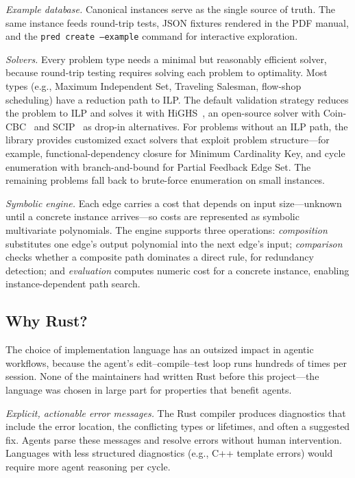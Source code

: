 \documentclass[conference]{IEEEtran}
\begin{document}
\emph{Example database.}
Canonical instances serve as the single source of truth.
The same instance feeds round-trip tests, JSON fixtures rendered in the PDF manual, and the \texttt{pred create --example} command for interactive exploration.

\emph{Solvers.}
Every problem type needs a minimal but reasonably efficient solver, because round-trip testing requires solving each problem to optimality.
Most types (e.g., Maximum Independent Set, Traveling Salesman, flow-shop scheduling) have a reduction path to ILP.
The default validation strategy reduces the problem to ILP and solves it with HiGHS~\cite{Huangfu2018HiGHS}, an open-source solver with Coin-CBC~\cite{Forrest2023CoinCBC} and SCIP~\cite{Achterberg2009SCIP} as drop-in alternatives.
For problems without an ILP path, the library provides customized exact solvers that exploit problem structure---for example, functional-dependency closure for Minimum Cardinality Key, and cycle enumeration with branch-and-bound for Partial Feedback Edge Set.
The remaining problems fall back to brute-force enumeration on small instances.

\emph{Symbolic engine.}
Each edge carries a cost that depends on input size---unknown until a concrete instance arrives---so costs are represented as symbolic multivariate polynomials.
The engine supports three operations: \emph{composition} substitutes one edge's output polynomial into the next edge's input; \emph{comparison} checks whether a composite path dominates a direct rule, for redundancy detection; and \emph{evaluation} computes numeric cost for a concrete instance, enabling instance-dependent path search.

\subsection{Why Rust?}\label{sec:why-rust}

The choice of implementation language has an outsized impact in agentic workflows, because the agent's edit--compile--test loop runs hundreds of times per session.
None of the maintainers had written Rust before this project---the language was chosen in large part for properties that benefit agents.

\emph{Explicit, actionable error messages.}
The Rust compiler produces diagnostics that include the error location, the conflicting types or lifetimes, and often a suggested fix.
Agents parse these messages and resolve errors without human intervention.
Languages with less structured diagnostics (e.g., C++ template errors) would require more agent reasoning per cycle.
\end{document}
